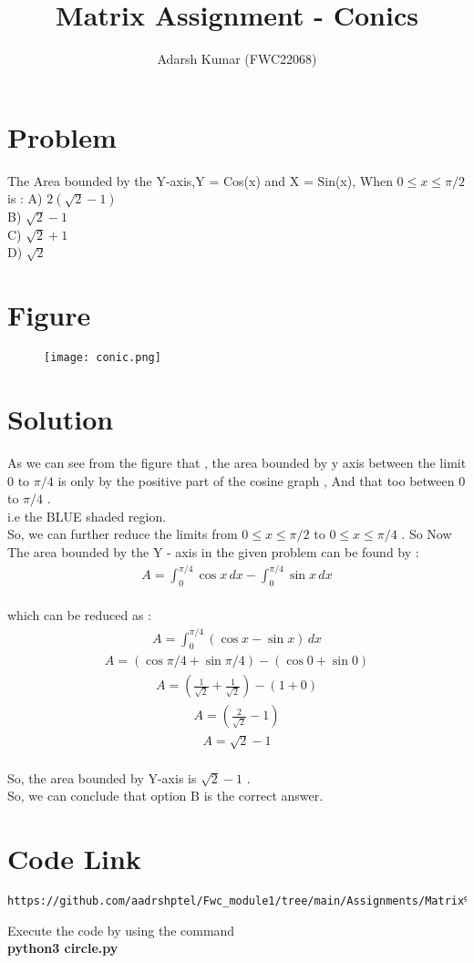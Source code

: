 \documentclass[journal,12pt,twocolumn]{IEEEtran}
\title{\mytitle}
\title{
Matrix Assignment - Conics
}
\author{Adarsh Kumar (FWC22068)}
\begin{document}
\maketitle
\tableofcontents
\bigskip


\section{\textbf{Problem}}
The Area bounded by the Y-axis,Y = Cos(x) and X = Sin(x),
When $0 \le x \le \pi/2$ is :
\linebreak
A) $2(\sqrt{2}-1)$ \\ B) $\sqrt{2}-1$\\ C) $\sqrt{2}+1$ \\D) $\sqrt{2}$
\\
\section{\textbf{Figure}}
\begin{figure}[H]
    \centering
\texttt{[image: conic.png]}
    \label{fig:my_label}
\end{figure}
\section{\textbf{Solution}}
As we can see from the figure that , the area bounded by y axis between the limit 0 to $\pi/4$ is only by the positive part of the cosine graph , And that too between 0 to $\pi/4$ .\\
i.e the BLUE shaded region.\\
So, we can further reduce the limits from $ 0 \le x \le \pi/2$ to 
$ 0 \le x \le \pi/4$ .
So Now
The area bounded by the Y - axis in the given problem can be found by :
\begin{align}
A = \int_{0}^{\pi/4} \cos x \,dx -  \int_{0}^{\pi/4} \sin x \,dx 
\end{align}
\\
which can be reduced as : 
\begin{align}
A =\int_{0}^{\pi/4} (\cos x - \sin x) \,dx
\end{align}
\begin{align}
A = (\cos{\pi/4} + \sin{\pi/4}) - (\cos{0} + \sin{0}) 
\end{align}
\begin{align}
A = (\frac{1}{\sqrt{2}}+ \frac{1}{\sqrt{2}}) - (1+0) 
\end{align}
\begin{align}
A = (\frac{2}{\sqrt{2}} - 1)
\end{align}
\begin{align}
A = \sqrt{2} -1
\end{align}
\\
So, the area bounded by Y-axis is $\sqrt{2}-1$ .\\
So, we can conclude that option B is the correct answer.
 


\section{\textbf{Code Link}}

\begin{lstlisting}
https://github.com/aadrshptel/Fwc_module1/tree/main/Assignments/Matrix%20assignments/Conics/codes
\end{lstlisting}
Execute the code by using the command\\
\textbf{python3 circle.py}
\end{document}
